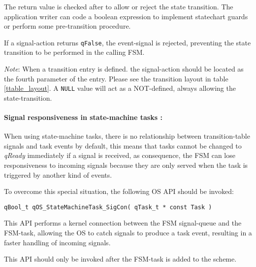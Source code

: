 The return value is checked after to allow or reject the state transition. The application writer can code a boolean expression to implement statechart guards or perform some pre-transition procedure.

\begin{tcolorbox}
\HandRight If a signal-action returns \lstinline{qFalse}, the event-signal is rejected, preventing the state transition to be performed in the calling FSM.
\end{tcolorbox}

\begin{tcolorbox}
\ArrowBoldDownRight \textit{Note}: When a transition entry is defined. the signal-action should be located as the fourth parameter of the entry. Please see the transition layout in table \ref{ttable_layout}.
A \lstinline{NULL} value will act as a NOT-defined, always allowing the state-transition. 
\end{tcolorbox}

\paragraph{Signal responsiveness in state-machine tasks :}

When using state-machine tasks, there is no relationship between transition-table signals and task events by default, this means that tasks cannot be changed to \textit{qReady} immediately if a signal is received, as consequence, the FSM can lose responsiveness to incoming signals because they are only served when the task is triggered by another kind of events. 

To overcome this special situation, the following OS API should be invoked: \\

\begin{lstlisting}[style=CStyle]
qBool_t qOS_StateMachineTask_SigCon( qTask_t * const Task )
\end{lstlisting} 

This API performs a kernel connection between the FSM signal-queue and the FSM-task, allowing the OS to catch signals to produce a task event, resulting in a faster handling of incoming signals. \\

\begin{tcolorbox}
\HandRight This API should only be invoked after the FSM-task is added to the scheme.
\end{tcolorbox}

